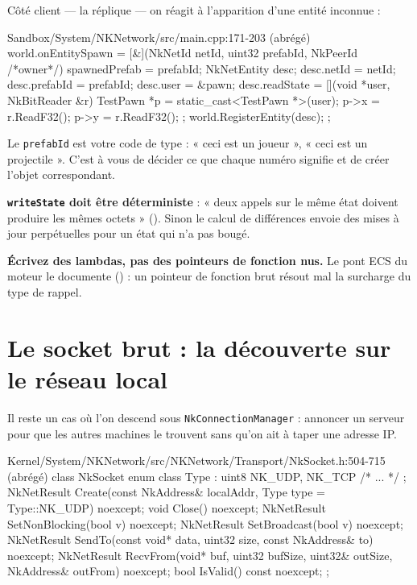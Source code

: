 Côté client — la réplique — on réagit à l'apparition d'une entité inconnue :

\begin{nkcode}{Sandbox/System/NKNetwork/src/main.cpp:171-203 (abrégé)}
        world.onEntitySpawn = [&](NkNetId netId, uint32 prefabId, NkPeerId /*owner*/) {
            spawnedPrefab = prefabId;
            NkNetEntity desc;
            desc.netId = netId;
            desc.prefabId = prefabId;
            desc.user = &pawn;
            desc.readState = [](void *user, NkBitReader &r) {
                TestPawn *p = static_cast<TestPawn *>(user);
                p->x = r.ReadF32();
                p->y = r.ReadF32();
            };
            world.RegisterEntity(desc);
        };
\end{nkcode}

Le \texttt{prefabId} est votre code de type : « ceci est un joueur », « ceci est
un projectile ». C'est à vous de décider ce que chaque numéro signifie et de
créer l'objet correspondant.

\begin{nkretenir}
\textbf{\texttt{writeState} doit être déterministe} : « deux appels sur le même
état doivent produire les mêmes octets »
(). Sinon le calcul de différences
envoie des mises à jour perpétuelles pour un état qui n'a pas bougé.

\textbf{Écrivez des lambdas, pas des pointeurs de fonction nus.} Le pont ECS du
moteur le documente
() : un
pointeur de fonction brut résout mal la surcharge du type de rappel.
\end{nkretenir}

\section{Le socket brut : la découverte sur le réseau local}

Il reste un cas où l'on descend sous \texttt{NkConnectionManager} : annoncer un
serveur pour que les autres machines le trouvent sans qu'on ait à taper une
adresse IP.

\begin{nkcode}{Kernel/System/NKNetwork/src/NKNetwork/Transport/NkSocket.h:504-715 (abrégé)}
class NkSocket {
        enum class Type : uint8 { NK_UDP, NK_TCP /* ... */ };
        NkNetResult Create(const NkAddress& localAddr, Type type = Type::NK_UDP) noexcept;
        void Close() noexcept;
        NkNetResult SetNonBlocking(bool v) noexcept;
        NkNetResult SetBroadcast(bool v) noexcept;
        NkNetResult SendTo(const void* data, uint32 size, const NkAddress& to) noexcept;
        NkNetResult RecvFrom(void* buf, uint32 bufSize, uint32& outSize, NkAddress& outFrom) noexcept;
        bool IsValid() const noexcept;
};
\end{nkcode}

